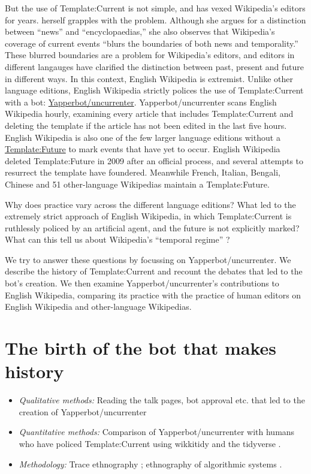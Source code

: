 \documentclass[Royal,times,sageh]{sagej}
\providecommand{\tightlist}{%
  \setlength{\itemsep}{0pt}\setlength{\parskip}{0pt}}
\begin{document}
But the use of Template:Current is not simple, and has vexed Wikipedia's
editors for years. \citet{avieson_breaking_2019} herself grapples with
the problem. Although she argues for a distinction between ``news'' and
``encyclopaedias,'' she also observes that Wikipedia's coverage of
current events ``blurs the boundaries of both news and temporality.''
These blurred boundaries are a problem for Wikipedia's editors, and
editors in different langauges have clarified the distinction between
past, present and future in different ways. In this context, English
Wikipedia is extremist. Unlike other language editions, English
Wikipedia strictly polices the use of Template:Current with a bot:
\href{https://en.wikipedia.org/wiki/User:Yapperbot}{Yapperbot/uncurrenter}.
Yapperbot/uncurrenter scans English Wikipedia hourly, examining every
article that includes Template:Current and deleting the template if the
article has not been edited in the last five hours. English Wikipedia is
also one of the few larger language editions without a
\href{https://wikipedia.org/wiki/Template:Future}{Template:Future} to
mark events that have yet to occur. English Wikipedia deleted
Template:Future in 2009 after an official process, and several attempts
to resurrect the template have foundered. Meanwhile French, Italian,
Bengali, Chinese and 51 other-language Wikipedias maintain a
Template:Future.

Why does practice vary across the different language editions? What led
to the extremely strict approach of English Wikipedia, in which
Template:Current is ruthlessly policed by an artificial agent, and the
future is not explicitly marked? What can this tell us about Wikipedia's
``temporal regime'' \citep{assmann_is_2020}?

We try to answer these questions by focussing on Yapperbot/uncurrenter.
We describe the history of Template:Current and recount the debates that
led to the bot's creation. We then examine Yapperbot/uncurrenter's
contributions to English Wikipedia, comparing its practice with the
practice of human editors on English Wikipedia and other-language
Wikipedias.

\hypertarget{the-birth-of-the-bot-that-makes-history}{%
\section{The birth of the bot that makes
history}\label{the-birth-of-the-bot-that-makes-history}}

\begin{itemize}
\tightlist
\item
  \emph{Qualitative methods:} Reading the talk pages, bot approval etc.
  that led to the creation of Yapperbot/uncurrenter
\item
  \emph{Quantitative methods:} Comparison of Yapperbot/uncurrenter with
  humans who have policed Template:Current using wikkitidy
  \citep{falk_wikkitidy_2023} and the tidyverse
  \citep{wickham_welcome_2019}.
\item
  \emph{Methodology:} Trace ethnography \citep{geiger_trace_2011};
  ethnography of algorithmic systems
  \citep{seaver_algorithms_2017, geiger_beyond_2017}.
\end{itemize}
\end{document}
